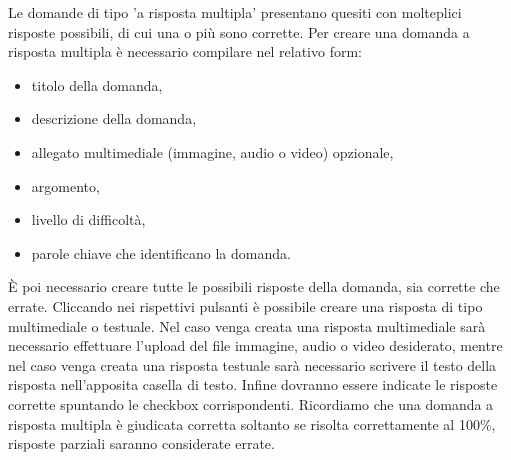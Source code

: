 \documentclass[a4paper, titlepage]{article}
\begin{document}
	 Le domande di tipo 'a risposta multipla' presentano quesiti con molteplici risposte possibili, di cui una o più sono corrette.
	 Per creare una domanda a risposta multipla è necessario compilare nel relativo form:
	 \begin{itemize}
	 	\item titolo della domanda,
	 	\item descrizione della domanda,
	 	\item allegato multimediale (immagine, audio o video) opzionale,
	 	\item argomento,
	 	\item livello di difficoltà,
	 	\item parole chiave che identificano la domanda.
	 \end{itemize}
	 È poi necessario creare tutte le possibili risposte della domanda, sia corrette che errate. Cliccando nei rispettivi pulsanti è possibile creare una risposta di tipo multimediale o testuale. Nel caso venga creata una risposta multimediale sarà necessario effettuare l'upload del file immagine, audio o video desiderato, mentre nel caso venga creata una risposta testuale sarà necessario scrivere il testo della risposta nell'apposita casella di testo.
	 Infine dovranno essere indicate le risposte corrette spuntando le checkbox corrispondenti. Ricordiamo che una domanda a risposta multipla è giudicata corretta soltanto se risolta correttamente al 100\%, risposte parziali saranno considerate errate.
	 
	 \newpage
\end{document}
